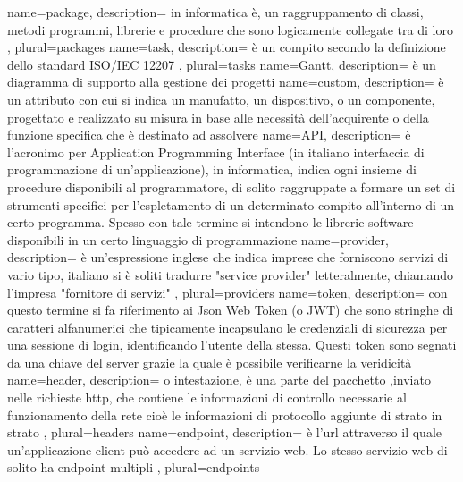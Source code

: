 \makenoidxglossaries
 {
	name=package,
	description={ in informatica è, un raggruppamento di classi, metodi programmi, librerie e procedure che sono logicamente collegate tra di loro
	},
	plural=packages
}
 {
	name=task,
	description={ è un compito secondo la definizione dello standard ISO/IEC 12207
	},
	plural=tasks
}
 {
	name=Gantt,
	description={  è un diagramma di supporto alla gestione dei progetti
	}
}
 {
	name=custom,
	description={ è un attributo con cui si indica un manufatto, un dispositivo, o un componente, progettato e realizzato su misura in base alle necessità dell'acquirente o della funzione specifica che è destinato ad assolvere
	}
}
 {
	name=API,
	description={ è l'acronimo per Application Programming Interface (in italiano interfaccia di programmazione di un'applicazione), in informatica, indica ogni insieme di procedure disponibili al programmatore, di solito raggruppate a formare un set di strumenti specifici per l'espletamento di un determinato compito all'interno di un certo programma. Spesso con tale termine si intendono le librerie software disponibili in un certo linguaggio di programmazione
	}
}
 {
	name=provider,
	description={ è un'espressione inglese che indica imprese che forniscono servizi di vario tipo,  italiano si è soliti tradurre "service provider" letteralmente, chiamando l'impresa "fornitore di servizi"
	},
	plural=providers
}
 {
	name=token,
	description={ con questo termine si fa riferimento ai Json Web Token (o JWT) che sono stringhe di caratteri alfanumerici che tipicamente incapsulano le credenziali di sicurezza per una sessione di login, identificando l'utente della stessa. Questi token sono segnati da una chiave del server grazie la quale è possibile verificarne la veridicità
	}
}
 {
	name=header,
	description={ o intestazione, è una parte del pacchetto ,inviato nelle richieste http, che contiene le informazioni di controllo necessarie al funzionamento della rete cioè le informazioni di protocollo aggiunte di strato in strato
	},
	plural=headers
}
 {
	name=endpoint,
	description={ è l'url attraverso il quale un'applicazione client può accedere ad un servizio web. Lo stesso servizio web di solito ha endpoint multipli
	},
	plural=endpoints
}
